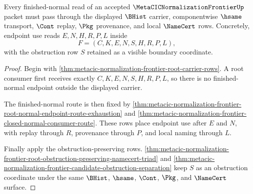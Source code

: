 \begin{theorem}
\label{thm:metacic-normalization-frontier-finished-normal-boundary}
Every finished-normal read of an accepted $\MetaCICNormalizationFrontierUp$ packet must pass through the displayed $\BHist$ carrier, componentwise $\hsame$ transport, $\Cont$ replay, $\Pkg$ provenance, and local $\NameCert$ rows. Concretely, endpoint use reads $E,N,H,R,P,L$ inside
$$
F=(C,K,E,N,S,H,R,P,L),
$$
with the obstruction row $S$ retained as a visible boundary coordinate.
\end{theorem}
\begin{proof}
Begin with \autoref{thm:metacic-normalization-frontier-root-carrier-rows}. A root consumer first receives exactly $C,K,E,N,S,H,R,P,L$, so there is no finished-normal endpoint outside the displayed carrier.

The finished-normal route is then fixed by \autoref{thm:metacic-normalization-frontier-root-normal-endpoint-route-exhaustion} and \autoref{thm:metacic-normalization-frontier-closed-normal-consumer-route}. These rows place endpoint use after $E$ and $N$, with replay through $R$, provenance through $P$, and local naming through $L$.

Finally apply the obstruction-preserving rows. \autoref{thm:metacic-normalization-frontier-root-obstruction-preserving-namecert-triad} and \autoref{thm:metacic-normalization-frontier-candidate-obstruction-separation} keep $S$ as an obstruction coordinate under the same $\BHist$, $\hsame$, $\Cont$, $\Pkg$, and $\NameCert$ surface.
\end{proof}

